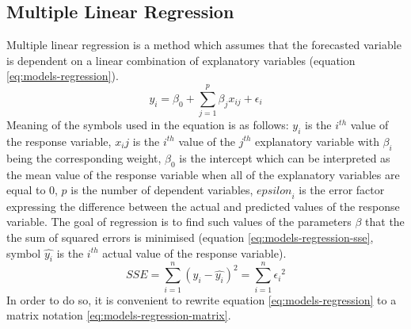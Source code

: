 \subsection{Multiple Linear Regression}\label{sec:models-regression}
Multiple linear regression is a method which assumes that the forecasted variable is dependent on a linear combination of explanatory variables (equation \ref{eq:models-regression}).
\begin{equation}\label{eq:models-regression}
    y_i = {\beta}_0 + \sum_{j = 1}^{p} {{\beta}_j x_{ij}} + {\epsilon}_i
\end{equation}
Meaning of the symbols used in the equation is as follows: $y_i$ is the $i^{th}$ value of the response variable, $x_ij$ is the $i^{th}$ value of the $j^{th}$ explanatory variable with ${\beta}_i$ being the corresponding weight, ${\beta}_0$ is the intercept which can be interpreted as the mean value of the response variable when all of the explanatory variables are equal to 0, $p$ is the number of dependent variables, ${epsilon}_i$ is the error factor expressing the difference between the actual and predicted values of the response variable. 
The goal of regression is to find such values of the parameters $\beta$ that the the sum of squared errors is minimised (equation \ref{eq:models-regression-sse}, symbol $\hat{y_i}$ is the $i^{th}$ actual value of the response variable).
\begin{equation}\label{eq:models-regression-sse}
    SSE = \sum_{i=1}^{n} {(y_i -  \hat{y_i})^2} = \sum_{i = 1}^{n} {{\epsilon}_i}^2
\end{equation}
In order to do so, it is convenient to rewrite equation \ref{eq:models-regression} to a matrix notation \ref{eq:models-regression-matrix}.
